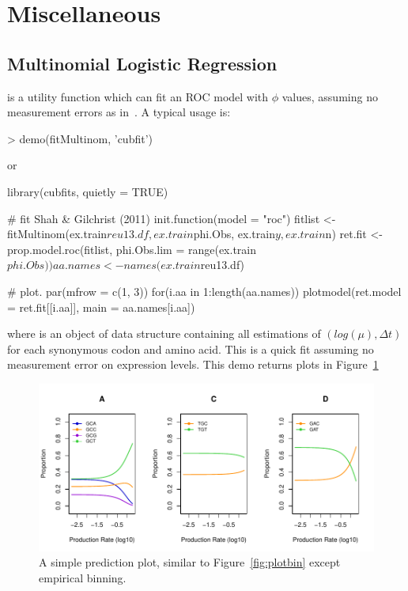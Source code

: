 
\section[Miscellaneous]{Miscellaneous}
\label{sec:misc}


\subsection[Multinomial Logistic Regression]{Multinomial Logistic Regression}
\label{sec:multinom}


 is a utility function which can fit an ROC model with
$\phi$ values, assuming no measurement errors as in~\citet{Shah2011}.
A typical usage is:
\begin{Code}
> demo(fitMultinom, 'cubfit')
\end{Code}
or
\begin{Code}
library(cubfits, quietly = TRUE)

# fit Shah & Gilchrist (2011)
init.function(model = "roc")
fitlist <- fitMultinom(ex.train$reu13.df, ex.train$phi.Obs,
                       ex.train$y, ex.train$n)
ret.fit <- prop.model.roc(fitlist, phi.Obs.lim = range(ex.train$phi.Obs))
aa.names <- names(ex.train$reu13.df)

# plot.
par(mfrow = c(1, 3))
for(i.aa in 1:length(aa.names)){
  plotmodel(ret.model = ret.fit[[i.aa]], main = aa.names[i.aa])
}
\end{Code}
where  is an object of  data structure containing
all estimations of $(log(\mu), \Delta t)$ for each synonymous codon and
amino acid.
This is a quick fit assuming no measurement error on expression levels.
This demo returns plots in Figure~\ref{fig:fitMultinom}
\begin{figure}[ht]
\centering
\includegraphics[width=6in]{cubfits-include/figure/fitMultinom}
\caption{A simple prediction plot, similar to Figure~\ref{fig:plotbin}
except empirical binning.
}
\label{fig:fitMultinom}
\end{figure}


